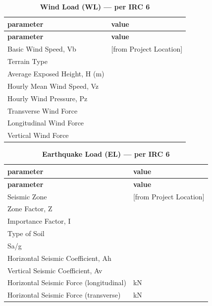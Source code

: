 \documentclass[12pt,a4paper]{report}
\numberwithin{table}{chapter}
\numberwithin{figure}{chapter}
\newcommand{\ReportTableGap}{\vspace{1em}}
\begin{document}
\ReportTableGap
\begin{longtable}{|L{5.5cm}|p{10.0cm}|}
\caption{\textbf{Wind Load (WL) --- per IRC 6}}\\
\hline
\textbf{parameter} & \textbf{value} \\
\hline
\endfirsthead
\hline
\textbf{parameter} & \textbf{value} \\
\hline
\endhead

\textnormal{Basic Wind Speed, Vb} &  [from Project Location] \\[6pt]
\hline
\textnormal{Terrain Type} &  \\[6pt]
\hline
\textnormal{Average Exposed Height, H (m)} &  \\[6pt]
\hline
\textnormal{Hourly Mean Wind Speed, Vz} &  \\[6pt]
\hline
\textnormal{Hourly Wind Pressure, Pz} &  \\[6pt]
\hline
\textnormal{Transverse Wind Force} &  \\[6pt]
\hline
\textnormal{Longitudinal Wind Force} &  \\[6pt]
\hline
\textnormal{Vertical Wind Force} &  \\[6pt]
\hline
\end{longtable}

\ReportTableGap
\begin{longtable}{|L{5.5cm}|p{10.0cm}|}
\caption{\textbf{Earthquake Load (EL) --- per IRC 6}}\\
\hline
\textbf{parameter} & \textbf{value} \\
\hline
\endfirsthead
\hline
\textbf{parameter} & \textbf{value} \\
\hline
\endhead

\textnormal{Seismic Zone} &  [from Project Location] \\[6pt]
\hline
\textnormal{Zone Factor, Z} &  \\[6pt]
\hline
\textnormal{Importance Factor, I} &  \\[6pt]
\hline
\textnormal{Type of Soil} &  \\[6pt]
\hline
\textnormal{Sa/g} &  \\[6pt]
\hline
\textnormal{Horizontal Seismic Coefficient, Ah} &  \\[6pt]
\hline
\textnormal{Vertical Seismic Coefficient, Av} &  \\[6pt]
\hline
\textnormal{Horizontal Seismic Force (longitudinal)} &  kN \\[6pt]
\hline
\textnormal{Horizontal Seismic Force (transverse)} &  kN \\[6pt]
\hline
\end{longtable}
\end{document}
